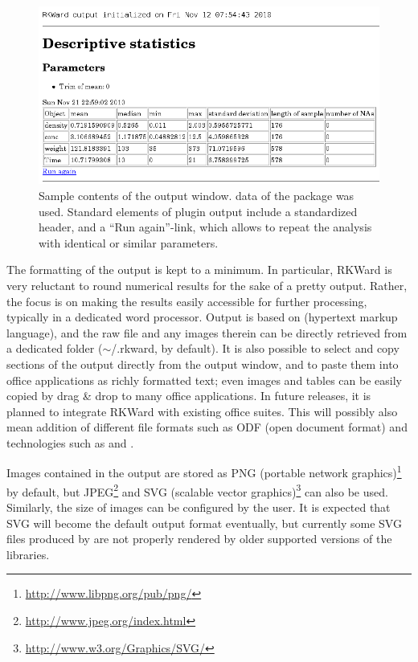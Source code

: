 \begin{figure}[t!]
 \centering
 \includegraphics[width=15.5cm]{../figures/results_output_cropped.png}
 \caption{Sample contents of the output window.  data of the  package was used. 
  Standard elements of plugin output include a standardized header, and a 
  ``Run again''-link, which allows to repeat the analysis with identical or 
  similar parameters.}
 \label{fig:results_output}
\end{figure}

The formatting of the output is kept to a minimum. In particular,
RKWard is very reluctant to round numerical results for the sake of a
pretty output. Rather, the focus is on making the results easily
accessible for further processing, typically in a dedicated word
processor. Output is based on
 (hypertext markup language), and the raw
 file and any images therein can be directly
retrieved from a dedicated folder
($\sim\!$/.rkward, by default). It is also
possible to select and copy sections of the output directly from the
output window, and to paste them into office applications as
richly formatted text; even images and tables can be easily copied by drag \& drop to many office applications. In future releases, 
it is planned to integrate RKWard
with existing office suites. This
will possibly also mean addition of different file formats such as ODF (open
document format) and technologies such as  and 
\citep{Leisch2002, Kuhn2006}.

Images contained in the output are stored as
PNG (portable network graphics)\footnote{\url{http://www.libpng.org/pub/png/}} by
default, but JPEG\footnote{\url{http://www.jpeg.org/index.html}} and
SVG (scalable vector graphics)\footnote{\url{http://www.w3.org/Graphics/SVG/}}
can also be used. Similarly, the size of 
images can be configured by the user. It is expected that SVG will
become the default output format eventually, but currently some SVG
files produced by  are not properly
rendered by older supported versions of the
 libraries.

